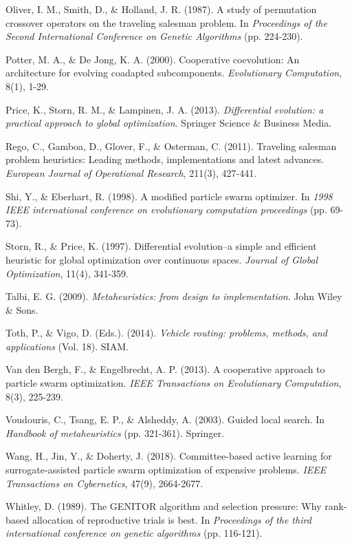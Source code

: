\documentclass[12pt,a4paper]{article}
\begin{document}
\begin{thebibliography}{99}
Oliver, I. M., Smith, D., \& Holland, J. R. (1987). A study of permutation crossover operators on the traveling salesman problem. In \textit{Proceedings of the Second International Conference on Genetic Algorithms} (pp. 224-230).

Potter, M. A., \& De Jong, K. A. (2000). Cooperative coevolution: An architecture for evolving coadapted subcomponents. \textit{Evolutionary Computation}, 8(1), 1-29.

Price, K., Storn, R. M., \& Lampinen, J. A. (2013). \textit{Differential evolution: a practical approach to global optimization}. Springer Science \& Business Media.

Rego, C., Gamboa, D., Glover, F., \& Osterman, C. (2011). Traveling salesman problem heuristics: Leading methods, implementations and latest advances. \textit{European Journal of Operational Research}, 211(3), 427-441.

Shi, Y., \& Eberhart, R. (1998). A modified particle swarm optimizer. In \textit{1998 IEEE international conference on evolutionary computation proceedings} (pp. 69-73).

Storn, R., \& Price, K. (1997). Differential evolution–a simple and efficient heuristic for global optimization over continuous spaces. \textit{Journal of Global Optimization}, 11(4), 341-359.

Talbi, E. G. (2009). \textit{Metaheuristics: from design to implementation}. John Wiley \& Sons.

Toth, P., \& Vigo, D. (Eds.). (2014). \textit{Vehicle routing: problems, methods, and applications} (Vol. 18). SIAM.

Van den Bergh, F., \& Engelbrecht, A. P. (2013). A cooperative approach to particle swarm optimization. \textit{IEEE Transactions on Evolutionary Computation}, 8(3), 225-239.

Voudouris, C., Tsang, E. P., \& Alsheddy, A. (2003). Guided local search. In \textit{Handbook of metaheuristics} (pp. 321-361). Springer.

Wang, H., Jin, Y., \& Doherty, J. (2018). Committee-based active learning for surrogate-assisted particle swarm optimization of expensive problems. \textit{IEEE Transactions on Cybernetics}, 47(9), 2664-2677.

Whitley, D. (1989). The GENITOR algorithm and selection pressure: Why rank-based allocation of reproductive trials is best. In \textit{Proceedings of the third international conference on genetic algorithms} (pp. 116-121).


\end{thebibliography}
\end{document}
